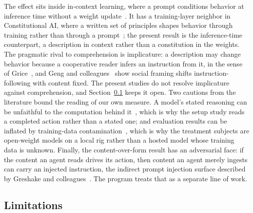 \documentclass[11pt,a4paper]{article}
\begin{document}
The effect sits inside in-context learning, where a prompt conditions behavior at
inference time without a weight update~\citep{dong2023icl}. It has a training-layer
neighbor in Constitutional AI, where a written set of principles shapes behavior through
training rather than through a prompt~\citep{bai2022constitutional}; the present result
is the inference-time counterpart, a description in context rather than a constitution in
the weights. The pragmatic rival to comprehension is implicature: a description may
change behavior because a cooperative reader infers an instruction from it, in the sense
of Grice~\citep{grice1975}, and Geng and colleagues~\citep{geng2026measuring} show
social framing shifts instruction-following with content fixed. The present studies do
not resolve implicature against comprehension, and Section~\ref{sec:limitations} keeps
it open. Two cautions from the literature bound the reading of our own measure. A
model's stated reasoning can be unfaithful to the computation behind
it~\citep{turpin2023}, which is why the setup study reads a completed action rather than
a stated one; and evaluation results can be inflated by training-data
contamination~\citep{golchin2023}, which is why the treatment subjects are open-weight
models on a local rig rather than a hosted model whose training data is unknown. Finally,
the content-over-form result has an adversarial face: if the content an agent reads
drives its action, then content an agent merely ingests can carry an injected
instruction, the indirect prompt injection surface described by Greshake and
colleagues~\citep{greshake2023}. The program treats that as a separate line of work.

\subsection{Limitations}\label{sec:limitations}
\end{document}

